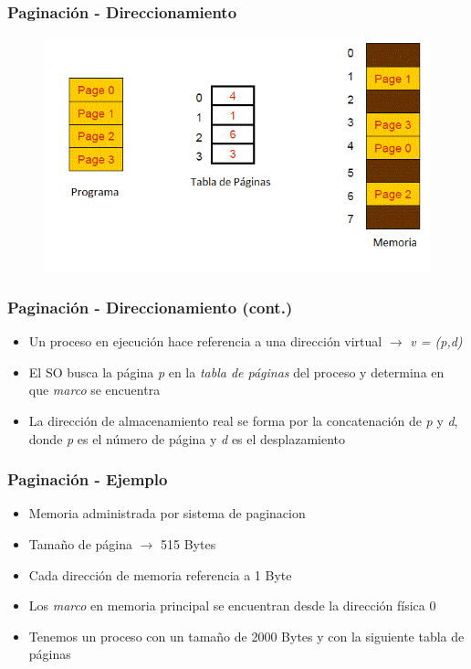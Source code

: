 \begin{frame}
  \frametitle{Paginación - \textbf{Direccionamiento}}
  \begin{figure}
    \includegraphics[scale=0.5]{images/pagination1.png}
  \end{figure}
\end{frame}

\begin{frame}
  \frametitle{Paginación - \textbf{Direccionamiento} (cont.)}
  \begin{itemize}
  	  \item Un proceso en ejecución hace referencia a una dirección virtual $\rightarrow$ \emph{v = (p,d)}
	  \item El SO busca la página \emph{p} en la \emph{tabla de páginas} del proceso y determina en que \emph{marco} se encuentra
	  \item La dirección de almacenamiento real se forma por la concatenación de \emph{p} y \emph{d}, donde \emph{p} es el número de página y \emph{d} es el desplazamiento
  \end{itemize}
\end{frame}

\begin{frame}
  \frametitle{Paginación - Ejemplo}
  \begin{itemize}
  	  \item Memoria administrada por sistema de paginacion
	  \item Tamaño de página $\rightarrow$ 515 Bytes
	  \item Cada dirección de memoria referencia a 1 Byte
	  \item Los \emph{marco} en memoria principal se encuentran desde la dirección física 0
	  \item Tenemos un proceso con un tamaño de 2000 Bytes y con la siguiente tabla de páginas
  \end{itemize}
\end{frame}

